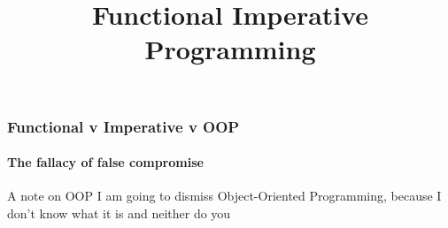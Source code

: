 {


  \begin{frame}[plain] 
  \title{Functional Imperative Programming}
  
  \vspace{3em}

  \begin{TitleBoxFunctionalImperativeProgramming}
    \begin{center}
    {\Large \inserttitle}
    \end{center}
  \end{TitleBoxFunctionalImperativeProgramming}

  \end{frame}
}


\begin{frame}
\frametitle{Functional v Imperative v OOP}
\framesubtitle{The fallacy of false compromise}
\begin{block}{A note on OOP}
I am going to dismiss Object-Oriented Programming, because I don't know what it is \tiny{and neither do you}
\end{block}
\end{frame}


